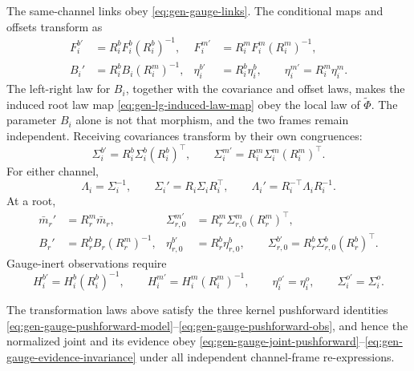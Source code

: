 The same-channel links obey \eqref{eq:gen-gauge-links}.  The conditional maps and offsets transform
as
\begin{align}
F_i^{b\prime}
&=R_i^bF_i^b(R_i^b)^{-1},
&
F_i^{m\prime}
&=R_i^mF_i^m(R_i^m)^{-1},
\label{eq:gen-gauge-selfmaps}\\
B_i'
&=R_i^bB_i(R_i^m)^{-1},
&
\eta_i^{b\prime}
&=R_i^b\eta_i^b,
\qquad
\eta_i^{m\prime}=R_i^m\eta_i^m.
\label{eq:gen-gauge-bridge-offsets}
\end{align}
The left-right law for $B_i$, together with the covariance and offset laws, makes the induced root
law map \eqref{eq:gen-lg-induced-law-map} obey the local law of $\widetilde\Phi$.  The parameter
$B_i$ alone is not that morphism, and the two frames remain independent.  Receiving covariances
transform by their own congruences:
\begin{equation}
\Sigma_i^{b\prime}=R_i^b\Sigma_i^b(R_i^b)^\top,
\qquad
\Sigma_i^{m\prime}=R_i^m\Sigma_i^m(R_i^m)^\top.
\label{eq:gen-gauge-covariances}
\end{equation}
For either channel,
\begin{equation}
\Lambda_i=\Sigma_i^{-1},
\qquad
\Sigma_i'=R_i\Sigma_iR_i^\top,
\qquad
\Lambda_i'=R_i^{-\top}\Lambda_iR_i^{-1}.
\label{eq:gen-gauge-precision}
\end{equation}
At a root,
\begin{align}
\bar m_r'
&=R_r^m\bar m_r,
&
\Sigma_{r,0}^{m\prime}
&=R_r^m\Sigma_{r,0}^m(R_r^m)^\top,
\label{eq:gen-gauge-root-model}\\
B_r'
&=R_r^bB_r(R_r^m)^{-1},
&
\eta_{r,0}^{b\prime}
&=R_r^b\eta_{r,0}^b,
\qquad
\Sigma_{r,0}^{b\prime}
=R_r^b\Sigma_{r,0}^b(R_r^b)^\top.
\label{eq:gen-gauge-root-state}
\end{align}
Gauge-inert observations require
\begin{equation}
H_i^{b\prime}=H_i^b(R_i^b)^{-1},
\qquad
H_i^{m\prime}=H_i^m(R_i^m)^{-1},
\qquad
\eta_i^{o\prime}=\eta_i^o,
\qquad
\Sigma_i^{o\prime}=\Sigma_i^o.
\label{eq:gen-gauge-observation}
\end{equation}

The transformation laws above satisfy the three kernel pushforward identities
\eqref{eq:gen-gauge-pushforward-model}--\eqref{eq:gen-gauge-pushforward-obs}, and hence the
normalized joint and its evidence obey
\eqref{eq:gen-gauge-joint-pushforward}--\eqref{eq:gen-gauge-evidence-invariance} under all
independent channel-frame re-expressions. 


